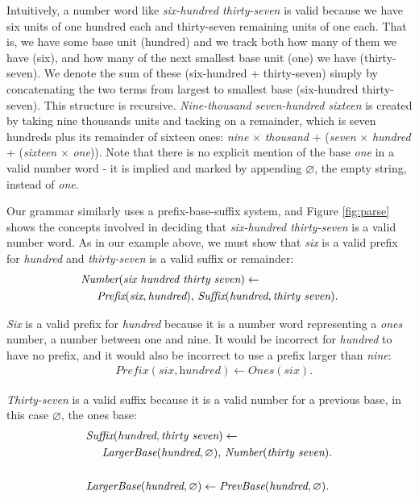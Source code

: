 \documentclass[10pt,letterpaper]{article}
\begin{document}
Intuitively, a number word like \emph{six-hundred thirty-seven} is
valid because we have six units of one hundred each and thirty-seven
remaining units of one each. That is, we have some base unit (hundred)
and we track both how many of them we have (six), and how many of the
next smallest base unit (one) we have (thirty-seven). We denote the
sum of these (six-hundred + thirty-seven) simply by concatenating the
two terms from largest to smallest base (six-hundred thirty-seven).
This structure is recursive. \emph{Nine-thousand seven-hundred
  sixteen} is created by taking nine thousands units and tacking on a
remainder, which is seven hundreds plus its remainder of sixteen ones:
\emph{nine} $\times$ \emph{thousand} $+$ (\emph{seven} $\times$
\emph{hundred} + (\emph{sixteen} $\times$ \emph{one})). Note that
there is no explicit mention of the base \emph{one} in a valid number
word - it is implied and marked by appending $\varnothing$, the empty
string, instead of \emph{one}.

Our grammar similarly uses a prefix-base-suffix system, and Figure
\ref{fig:parse} shows the concepts involved in deciding that
\emph{six-hundred thirty-seven} is a valid number word. As in our
example above, we must show that \emph{six} is a valid prefix for
\emph{hundred} and \emph{thirty-seven} is a valid suffix or remainder:
\setlength{\jot}{0pt}
\begin{align}
  & \textit{Number}(\textit{six hundred thirty seven}) \leftarrow\\
  & \hspace{0.5cm} \textit{Prefix}(\textit{six}, \textit{hundred}),\,\textit{Suffix}(\textit{hundred}, \textit{thirty seven}).\notag
\end{align}

\noindent\emph{Six} is a valid prefix for \emph{hundred} because it is
a number word representing a \emph{ones} number, a number between one
and nine. It would be incorrect for \emph{hundred} to have no prefix,
and it would also be incorrect to use a prefix larger than
\emph{nine}:
\begin{align}
  & \textit{Prefix}(\textit{six}, \textit{hundred}) \leftarrow \textit{Ones}(\textit{six}).
\end{align}

\noindent\emph{Thirty-seven} is a valid suffix because it is a valid
number for a previous base, in this case $\varnothing$, the ones base:
\begin{align}
  & \textit{Suffix}(\textit{hundred}, \textit{thirty seven}) \leftarrow\\
  & \hspace{0.5cm}  \textit{LargerBase}(\textit{hundred}, \varnothing),\,\textit{Number}(\textit{thirty seven}). \notag\\
  \notag\\
 &  \textit{LargerBase}(\textit{hundred}, \varnothing) \leftarrow \textit{PrevBase}(\textit{hundred}, \varnothing).
\end{align}
\end{document}
